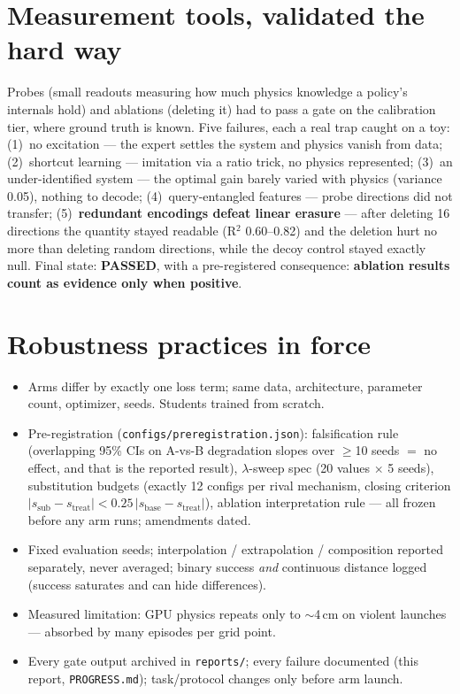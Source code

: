 \documentclass[10pt]{article}
\newcommand{\pass}{\textcolor{green!50!black}{\textbf{PASSED}}}
\begin{document}
\section{Measurement tools, validated the hard way}
Probes (small readouts measuring how much physics knowledge a policy's internals
hold) and ablations (deleting it) had to pass a gate on the calibration tier,
where ground truth is known. Five failures, each a real trap caught on a toy:
(1)~no excitation --- the expert settles the system and physics vanish from data;
(2)~shortcut learning --- imitation via a ratio trick, no physics represented;
(3)~an under-identified system --- the optimal gain barely varied with physics
(variance 0.05), nothing to decode; (4)~query-entangled features --- probe
directions did not transfer; (5)~\textbf{redundant encodings defeat linear
erasure} --- after deleting 16 directions the quantity stayed readable
(R$^2$ 0.60--0.82) and the deletion hurt no more than deleting random directions,
while the decoy control stayed exactly null. Final state: \pass{}, with a
pre-registered consequence: \textbf{ablation results count as evidence only when
positive}.

\section{Robustness practices in force}
\begin{itemize}
\item Arms differ by exactly one loss term; same data, architecture, parameter
count, optimizer, seeds. Students trained from scratch.
\item Pre-registration (\texttt{configs/preregistration.json}): falsification rule
(overlapping 95\% CIs on A-vs-B degradation slopes over $\ge$10 seeds $=$ no
effect, and that is the reported result), $\lambda$-sweep spec (20 values
$\times$ 5 seeds), substitution budgets (exactly 12 configs per rival mechanism,
closing criterion $|s_{\text{sub}}-s_{\text{treat}}| < 0.25\,|s_{\text{base}}-s_{\text{treat}}|$),
ablation interpretation rule --- all frozen before any arm runs; amendments dated.
\item Fixed evaluation seeds; interpolation / extrapolation / composition reported
separately, never averaged; binary success \emph{and} continuous distance logged
(success saturates and can hide differences).
\item Measured limitation: GPU physics repeats only to $\sim$4\,cm on violent
launches --- absorbed by many episodes per grid point.
\item Every gate output archived in \texttt{reports/}; every failure documented
(this report, \texttt{PROGRESS.md}); task/protocol changes only before arm launch.
\end{itemize}
\end{document}
